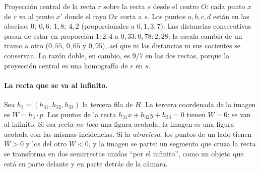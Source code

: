 \begin{center}
\end{center}
Proyección central de la recta \(r\) sobre la recta \(s\) desde el centro \(O\): cada punto
\(x\) de \(r\) va al punto \(x'\) donde el rayo \(Ox\) corta a \(s\). Los puntos
\(a,b,c,d\) están en las abscisas \(0;\ 0{,}6;\ 1{,}8;\ 4{,}2\) (proporcionales a \(0,1,3,7\)). Las
distancias consecutivas pasan de estar en proporción \(1:2:4\) a \(0{,}33:0{,}78:2{,}28\): la escala cambia de un tramo a otro
(\(0{,}55\), \(0{,}65\) y \(0{,}95\)), así que ni las distancias ni sus cocientes se conservan. La razón doble, en cambio, es \(9/7\) en
las dos rectas, porque la proyección central es una homografía de \(r\) en \(s\).

\paragraph{La recta que se va al infinito.}
Sea \(h_3=(h_{31},h_{32},h_{33})\) la tercera fila de \(H\). La tercera coordenada de la
imagen es \(W=h_3\cdot p\). Los puntos de la recta \(h_{31}x+h_{32}y+h_{33}=0\) tienen
\(W=0\): se van al infinito. Si esa recta \emph{no toca} una figura acotada, la imagen es una
figura acotada con las mismas incidencias. Si la \emph{atraviesa}, los puntos de un lado
tienen \(W>0\) y los del otro \(W<0\), y la imagen se parte: un segmento que cruza la recta se
transforma en dos semirrectas unidas \enquote{por el infinito}, como un objeto que está en parte
delante y en parte detrás de la cámara.


